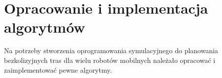 \chapter{Opracowanie i implementacja algorytmów}
\label{ch:alg-impl}

Na potrzeby stworzenia oprogramowania symulacyjnego do planowania bezkolizyjnych tras dla wielu robotów mobilnych należało opracować i zaimplementować pewne algorytmy.